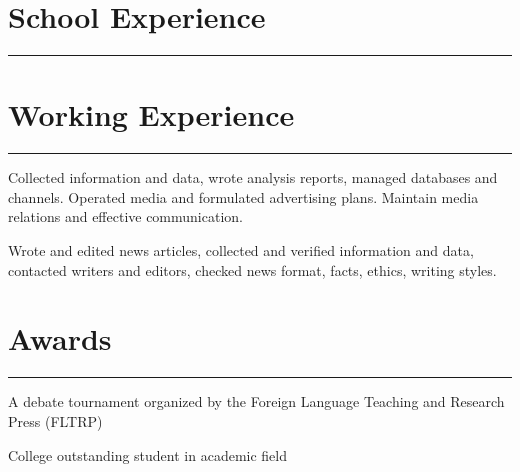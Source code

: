 \documentclass[]{rahulworld-resume}
\begin{document}
\begin{minipage}[t]{0.66\textwidth}
\section{School Experience}
\noindent\rule{12.5cm}{0.4pt}

 
\noindent
\hspace{5em}%

 
\noindent
\hspace{5em}%

\section{Working Experience}
\noindent\rule{12.5cm}{0.4pt}

 
\noindent
\hspace{5em}%
\begin{minipage}{0.85\textwidth\vspace{5pt}}
Collected information and data, wrote analysis reports, managed databases and channels. Operated media and formulated advertising plans. Maintain media relations and effective communication. 
\end{minipage}

 
\noindent
\hspace{5em}%
\begin{minipage}{0.85\textwidth\vspace{5pt}}
Wrote and edited news articles, collected and verified information and data, contacted writers and editors, checked news format, facts, ethics, writing styles.
\end{minipage}
\section{Awards} 
\noindent\rule{12.5cm}{0.4pt}

 
\descript{}
\noindent
\hspace{5em}%
\begin{minipage}{0.85\textwidth\vspace{2pt}}
A debate tournament organized by the Foreign Language Teaching and Research Press (FLTRP)
\end{minipage}

 
\descript{}
\noindent
\hspace{5em}%
\begin{minipage}{0.85\textwidth\vspace{2pt}}
College outstanding student in academic field
\end{minipage}
\end{minipage} 
\end{document}
